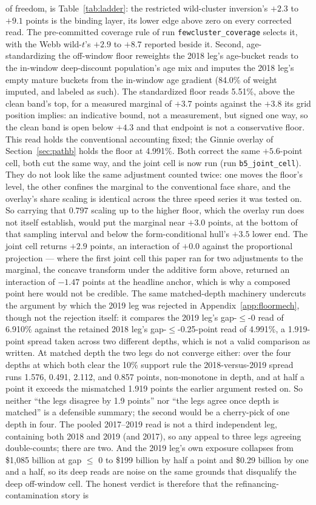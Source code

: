 \documentclass[12pt]{article}
\begin{document}
of freedom, is Table~\ref{tab:ladder}: the restricted wild-cluster inversion's $+2.3$ to $+9.1$ points is the binding layer, its lower edge above zero on every corrected read. The pre-committed coverage rule of run \texttt{fewcluster\_coverage} selects it, with the Webb wild-$t$'s $+2.9$ to $+8.7$ reported beside it. Second, age-standardizing the off-window floor reweights the 2018 leg's age-bucket reads to the in-window deep-discount population's age mix and imputes the 2018 leg's empty mature buckets from the in-window age gradient (84.0\% of weight imputed, and labeled as such). The standardized floor reads 5.51\%, above the clean band's top, for a measured marginal of $+3.7$ points against the $+3.8$ its grid position implies: an indicative bound, not a measurement, but signed one way, so the clean band is open below $+4.3$ and that endpoint is not a conservative floor. This read holds the conventional accounting fixed; the Ginnie overlay of Section~\ref{sec:pathb} holds the floor at 4.991\%. Both correct the same $+5.6$-point cell, both cut the same way, and the joint cell is now run (run \texttt{b5\_joint\_cell}). They do not look like the same adjustment counted twice: one moves the floor's level, the other confines the marginal to the conventional face share, and the overlay's share scaling is identical across the three speed series it was tested on. So carrying that $0.797$ scaling up to the higher floor, which the overlay run does not itself establish, would put the marginal near $+3.0$ points, at the bottom of that sampling interval and below the form-conditional hull's $+3.5$ lower end. The joint cell returns $+2.9$ points, an interaction of $+0.0$ against the proportional projection --- where the first joint cell this paper ran for two adjustments to the marginal, the concave transform under the additive form above, returned an interaction of $-1.47$ points at the headline anchor, which is why a composed point here would not be credible. The same matched-depth machinery undercuts the argument by which the 2019 leg was rejected in Appendix~\ref{app:floormech}, though not the rejection itself: it compares the 2019 leg's gap-$\leq$-0 read of 6.910\% against the retained 2018 leg's gap-$\leq$-0.25-point read of 4.991\%, a 1.919-point spread taken across two different depths, which is not a valid comparison as written. At matched depth the two legs do not converge either: over the four depths at which both clear the 10\% support rule the 2018-versus-2019 spread runs 1.576, 0.491, 2.112, and 0.857 points, non-monotone in depth, and at half a point it exceeds the mismatched 1.919 points the earlier argument rested on. So neither ``the legs disagree by 1.9 points'' nor ``the legs agree once depth is matched'' is a defensible summary; the second would be a cherry-pick of one depth in four. The pooled 2017--2019 read is not a third independent leg, containing both 2018 and 2019 (and 2017), so any appeal to three legs agreeing double-counts; there are two. And the 2019 leg's own exposure collapses from \$1{,}085 billion at gap $\leq$ 0 to \$199 billion by half a point and \$0.29 billion by one and a half, so its deep reads are noise on the same grounds that disqualify the deep off-window cell. The honest verdict is therefore that the refinancing-contamination story is 
\end{document}
